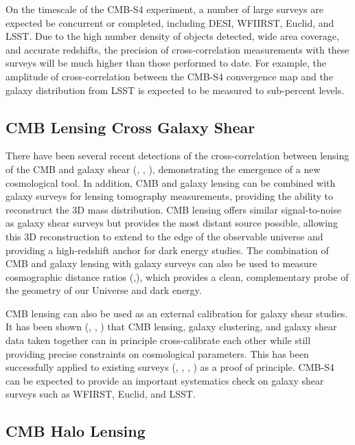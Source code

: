 On the timescale of the CMB-S4 experiment, a number of large surveys are expected be concurrent or completed, including DESI, WFIIRST, Euclid, and LSST.  Due to the high number density of objects detected, wide area coverage, and accurate redshifts, the precision of cross-correlation measurements with these surveys will be much higher than those performed to date.  For example, the amplitude of cross-correlation between the CMB-S4 convergence map and the galaxy distribution from LSST is expected to be measured to sub-percent levels.  


\subsection{CMB Lensing Cross Galaxy Shear}\label{lensxlens}


There have been several recent detections of the cross-correlation between lensing of the CMB and galaxy shear (\cite{Hand:2013xua}, \cite{Liu:2015xfa}, \cite{Kirk:2015dpw}), demonstrating the emergence of a new cosmological tool. In addition, CMB and galaxy lensing can be combined with galaxy surveys for lensing tomography measurements, providing the ability to reconstruct the 3D mass distribution. CMB lensing offers similar signal-to-noise as galaxy shear surveys but provides the most distant source possible, allowing this 3D reconstruction to extend to the edge of the observable universe and providing a high-redshift anchor for dark energy studies.  The combination of CMB and galaxy lensing with galaxy surveys can also be used to measure cosmographic distance ratios (\cite{Miyatake:2016gdc},\cite{Singh:2016xey}), which provides a clean, complementary probe of the geometry of our Universe and dark energy. 

CMB lensing can also be used as an external calibration for galaxy shear studies. It has been shown (\cite{Vallinotto:2011ge}, \cite{Vallinotto:2013eva}, \cite{Das:2013aia}) that CMB lensing, galaxy clustering, and galaxy shear data taken together can in principle cross-calibrate each other while still providing precise constraints on cosmological parameters. This has been successfully applied to existing surveys (\cite{Liu:2015xfa}, \cite{Baxter:2016ziy}, \cite{Miyatake:2016gdc}, \cite{Singh:2016xey}) as a proof of principle. CMB-S4 can be expected to provide an important systematics check on galaxy shear surveys such as WFIRST, Euclid, and LSST. 

\subsection{CMB Halo Lensing}\label{haloLensing}

